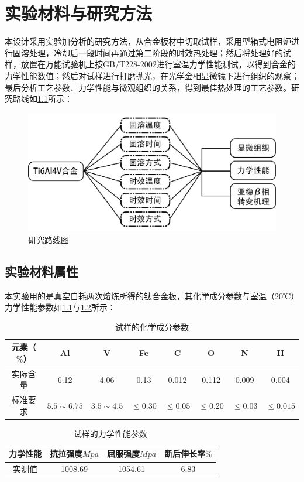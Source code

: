 \chapter{实验材料与研究方法}

本设计采用实验加分析的研究方法，从\ti 合金板材中切取试样，采用型箱式电阻炉进行固溶处理，冷却后一段时间再通过第二阶段的时效热处理；然后将处理好的试样，放置在万能试验机上按{GB/T228-2002}进行室温力学性能测试，以得到合金的力学性能数值；然后对试样进行打磨抛光，在光学金相显微镜下进行组织的观察；最后分析工艺参数、力学性能与微观组织的关系，得到最佳热处理的工艺参数。研究路线如\ref{fig:roadmap}所示：

\begin{figure}[h!]
	\centering
	\includegraphics[width=0.8\linewidth]{pic/路线图}
	\caption{研究路线图}
	\label{fig:roadmap}
\end{figure}
\section{实验材料属性}
本实验用的是真空自耗两次熔炼所得的钛合金板，其化学成分参数与室温（20℃）力学性能参数如\ref{sec:mytc4chem}与\ref{sec:mytc4machin}所示：
\begin{table}[htbp]
	\centering
	\caption{试样的化学成分参数}
	\label{sec:mytc4chem}
	\begin{tabular}{cccccccc}
		\toprule
		元素（$ \% $） & Al & V &Fe &C& O& N &H \\ \midrule
		实际含量 & 6.12&4.06 &0.13 &0.012&0.112&0.009&0.004  \\
		标准要求 &$ 5.5\sim 6.75 $ & $ 3.5\sim 4.5 $&$ \le 0.30 $ & $ \le 0.05 $&$ \le 0.20 $&$ \le 0.03$ &$ \le 0.015 $ \\ \bottomrule
	\end{tabular}
\end{table}
\begin{table}[htbp]
	\centering
	\caption{试样的力学性能参数}
	\label{sec:mytc4machin}
	\begin{tabular}{cccc}
		\toprule
		力学性能& 抗拉强度$Mpa  $& 屈服强度$ Mpa $&断后伸长率$ \% $\\ \midrule
		实测值 & 1008.69 & 1054.61 & 6.83\\ \bottomrule
	\end{tabular}
\end{table}

